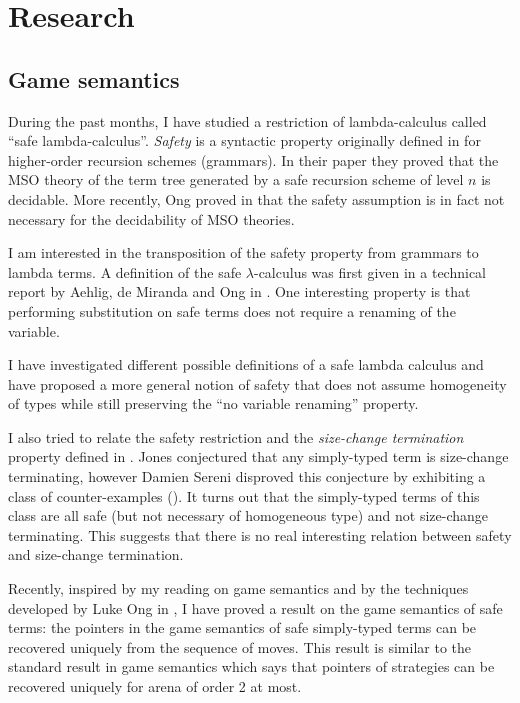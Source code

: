 \section{Research}

\subsection{Game semantics}

During the past months, I have studied a restriction of
lambda-calculus called ``safe lambda-calculus''. \emph{Safety} is a
syntactic property originally defined in \cite{KNU02} for
higher-order recursion schemes (grammars). In their paper they
proved that the MSO theory of the term tree generated by a safe
recursion scheme of level $n$ is decidable. More recently, Ong
proved in \cite{OngLics2006} that the safety assumption is in fact
not necessary for the decidability of MSO theories.

I am interested in the transposition of the safety property from
grammars to lambda terms. A definition of the safe
$\lambda$-calculus was first given in a technical report by Aehlig,
de Miranda and Ong in \cite{safety-mirlong2004}. One interesting
property is that performing substitution on safe terms does not
require a renaming of the variable.

I have investigated different possible definitions of a safe lambda
calculus and have proposed a more general notion of safety that does
not assume homogeneity of types while still preserving  the ``no
variable renaming'' property.

I also tried to relate the safety restriction and the
\emph{size-change termination} property defined in
\cite{jones01,jones04}. Jones conjectured that any simply-typed term
is size-change terminating, however Damien Sereni disproved this
conjecture by exhibiting a class of counter-examples
(\cite{serenistypesct05}). It turns out that the simply-typed terms
of this class are all safe (but not necessary of homogeneous type)
and not size-change terminating. This suggests that there is no real
interesting relation between safety and size-change termination.


Recently, inspired by my reading on game semantics
\citep{abramsky:game-semantics-tutorial} and by the techniques
developed by Luke Ong in \citep{OngLics2006}, I have proved a result
on the game semantics of safe terms: the pointers in the game
semantics of safe simply-typed terms can be recovered uniquely from
the sequence of moves. This result is similar to the standard result
in game semantics which says that pointers of strategies can be
recovered uniquely for arena of order 2 at most.


